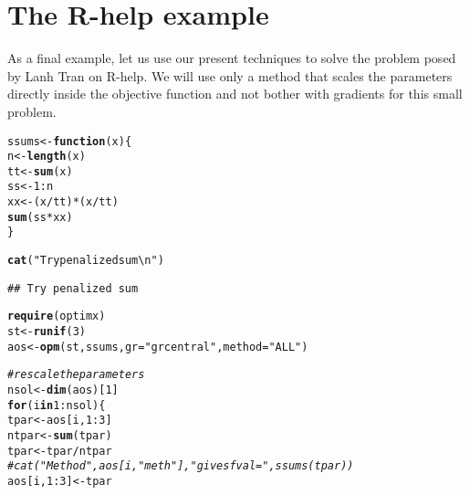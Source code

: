 \documentclass[11pt]{article}\usepackage[]{graphicx}\usepackage[]{color}
\makeatletter
\newcommand{\hlnum}[1]{\textcolor[rgb]{0.686,0.059,0.569}{#1}}%
\newcommand{\hlstr}[1]{\textcolor[rgb]{0.192,0.494,0.8}{#1}}%
\newcommand{\hlcom}[1]{\textcolor[rgb]{0.678,0.584,0.686}{\textit{#1}}}%
\newcommand{\hlopt}[1]{\textcolor[rgb]{0,0,0}{#1}}%
\newcommand{\hlstd}[1]{\textcolor[rgb]{0.345,0.345,0.345}{#1}}%
\newcommand{\hlkwa}[1]{\textcolor[rgb]{0.161,0.373,0.58}{\textbf{#1}}}%
\newcommand{\hlkwb}[1]{\textcolor[rgb]{0.69,0.353,0.396}{#1}}%
\newcommand{\hlkwc}[1]{\textcolor[rgb]{0.333,0.667,0.333}{#1}}%
\newcommand{\hlkwd}[1]{\textcolor[rgb]{0.737,0.353,0.396}{\textbf{#1}}}%
\newenvironment{kframe}{%
 \def\at@end@of@kframe{}%
 \ifinner\ifhmode%
  \def\at@end@of@kframe{\end{minipage}}%
  \begin{minipage}{\columnwidth}%
 \fi\fi%
 \def\FrameCommand##1{\hskip\@totalleftmargin \hskip-\fboxsep
 \colorbox{shadecolor}{##1}\hskip-\fboxsep
     \hskip-\linewidth \hskip-\@totalleftmargin \hskip\columnwidth}%
 \MakeFramed {\advance\hsize-\width
   \@totalleftmargin\z@ \linewidth\hsize
   \@setminipage}}%
 {\par\unskip\endMakeFramed%
 \at@end@of@kframe}
\newenvironment{knitrout}{}{} %
\makeatother
\begin{document}
\section{The R-help example}

As a final example, let us use our present techniques to solve the 
problem posed by Lanh Tran on R-help. We will use
only a method that scales the parameters directly inside the objective function and 
not bother with gradients for this small problem. 

\begin{knitrout}\scriptsize
{}\color{fgcolor}\begin{kframe}
\begin{alltt}
\hlstd{ssums}\hlkwb{<-}\hlkwa{function}\hlstd{(}\hlkwc{x}\hlstd{)\{}
  \hlstd{n}\hlkwb{<-}\hlkwd{length}\hlstd{(x)}
  \hlstd{tt}\hlkwb{<-}\hlkwd{sum}\hlstd{(x)}
  \hlstd{ss}\hlkwb{<-}\hlnum{1}\hlopt{:}\hlstd{n}
  \hlstd{xx}\hlkwb{<-}\hlstd{(x}\hlopt{/}\hlstd{tt)}\hlopt{*}\hlstd{(x}\hlopt{/}\hlstd{tt)}
  \hlkwd{sum}\hlstd{(ss}\hlopt{*}\hlstd{xx)}
\hlstd{\}}

\hlkwd{cat}\hlstd{(}\hlstr{"Try penalized sum\textbackslash{}n"}\hlstd{)}
\end{alltt}
\begin{verbatim}
## Try penalized sum
\end{verbatim}
\begin{alltt}
\hlkwd{require}\hlstd{(optimx)}
\hlstd{st}\hlkwb{<-}\hlkwd{runif}\hlstd{(}\hlnum{3}\hlstd{)}
\hlstd{aos}\hlkwb{<-}\hlkwd{opm}\hlstd{(st, ssums,} \hlkwc{gr}\hlstd{=}\hlstr{"grcentral"}\hlstd{,} \hlkwc{method}\hlstd{=}\hlstr{"ALL"}\hlstd{)}
\end{alltt}


{\ttfamily\noindent\color{warningcolor}{\#\# Warning in Rvmminu(par = spar, fn = efn, gr = egr, control = mcontrol, ...): Too many gradient evaluations}}

{\ttfamily\noindent\color{warningcolor}{\#\# Warning in optimr(par, fn, gr, method = meth, lower = lower, upper = upper, : Successful convergence\ \ Restarts for stagnation =0}}\begin{alltt}
\hlcom{# rescale the parameters}
\hlstd{nsol}\hlkwb{<-}\hlkwd{dim}\hlstd{(aos)[}\hlnum{1}\hlstd{]}
\hlkwa{for} \hlstd{(i} \hlkwa{in} \hlnum{1}\hlopt{:}\hlstd{nsol)\{}
  \hlstd{tpar}\hlkwb{<-}\hlstd{aos[i,}\hlnum{1}\hlopt{:}\hlnum{3}\hlstd{]}
  \hlstd{ntpar}\hlkwb{<-}\hlkwd{sum}\hlstd{(tpar)}
  \hlstd{tpar}\hlkwb{<-}\hlstd{tpar}\hlopt{/}\hlstd{ntpar}
\hlcom{#  cat("Method ",aos[i, "meth"]," gives fval =", ssums(tpar))}
  \hlstd{aos[i,} \hlnum{1}\hlopt{:}\hlnum{3}\hlstd{]}\hlkwb{<-}\hlstd{tpar}


\end{alltt}
\end{kframe}
\end{knitrout}
\end{document}
